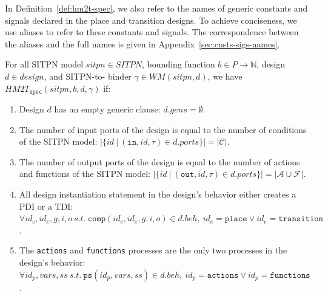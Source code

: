 \bigskip

In Definition~\ref{def:hm2t-spec}, we also refer to the names of
generic constants and signals declared in the place and transition
designs. To achieve conciseness, we use aliases to refer to these
constants and signals. The correspondence between the aliases and the
full names is given in Appendix~\ref{sec:cnsts-sigs-names}.


\def\pdiInBeh{\mathtt{comp}(\gamma(p),\mathtt{place},g_p,i_p,o_p)\in{}d.beh}
\def\tdiInBeh{\mathtt{comp}(\gamma(t),\mathtt{transition},g_t,i_t,o_t)\in{}d.beh}
\def\tdiInBehP#1{\mathtt{comp}(\gamma(#1),\mathtt{transition},g_{#1},i_{#1},o_{#1})\in{}d.beh}

\begin{definition}
  \label{def:hm2t-spec}
  For all SITPN model $sitpn\in{}SITPN$, bounding function
  $b\in{}P\rightarrow\mathbb{N}$, \hvhdl{} design $d\in{}design$, and
  SITPN-to-\hvhdl{} binder $\gamma\in{}WM(sitpn,d)$, we have
  $HM2T_{\mathtt{spec}}(sitpn,b,d,\gamma)$ if:
  
  \begin{enumerate}
  \item\label{it:emp-gen-clause} Design $d$ has an empty generic clause: $d.gens=\emptyset$.

  \item The number of input ports of the design is equal to the number
    of conditions of the SITPN model:
    $\vert\{id~\vert~(\mathtt{in},id,\tau)\in{}d.ports\}\vert=\vert\mathcal{C}\vert$.
  \item The number of output ports of the design is equal to the
    number of actions and functions of the SITPN model:
    $\vert\{id~\vert~(\mathtt{out},id,\tau)\in{}d.ports\}\vert=\vert\mathcal{A}\cup{}\mathcal{F}\vert$.

  \item\label{it:pdi-tdi-only} All design instantiation statement in
    the design's behavior
    either creates a PDI or a TDI: \\
    $\forall{}id_c,id_e,g,i,o~s.t.~\mathtt{comp}(id_c,id_e,g,i,o)\in{}d.beh,~id_e=\mathtt{place}\lor{}id_e=\mathtt{transition}$.
    
  \item\label{it:actions-functions-only} The \texttt{actions} and
    \texttt{functions} processes are the
    only two processes in the design's behavior:\\
    $\forall{}id_p,vars,ss~s.t.~\mathtt{ps}(id_p,vars,ss)\in{}d.beh,~id_p=\mathtt{actions}\lor{}id_p=\mathtt{functions}$.
    

\end{enumerate}
\end{definition}
